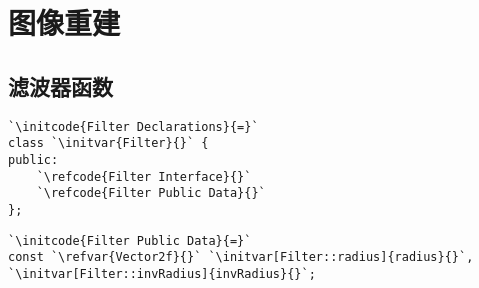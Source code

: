 \section{图像重建}\label{sec:图像重建}

\subsection{滤波器函数}\label{sub:滤波器函数}

\begin{lstlisting}
`\initcode{Filter Declarations}{=}`
class `\initvar{Filter}{}` {
public:
    `\refcode{Filter Interface}{}`
    `\refcode{Filter Public Data}{}`
};
\end{lstlisting}

\begin{lstlisting}
`\initcode{Filter Public Data}{=}`
const `\refvar{Vector2f}{}` `\initvar[Filter::radius]{radius}{}`, `\initvar[Filter::invRadius]{invRadius}{}`;
\end{lstlisting}